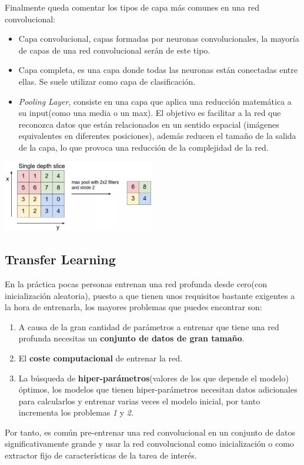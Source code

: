 \documentclass[12,twoside]{TFG-GM}
\theoremstyle{definition}
\theoremstyle{remark}
\begin{document}
Finalmente queda comentar los tipos de capa más comunes en una red convolucional: 
\begin{itemize}
\item Capa convolucional, capas formadas por neuronas convolucionales, la mayoría de capas de una red convolucional serán de este tipo.
\item Capa completa, es una capa donde todas las neuronas están conectadas entre ellas. Se suele utilizar como capa de clasificación. 
\item \textit{Pooling Layer}, consiste en una capa que aplica una reducción matemática a su input(como una media o un max). El objetivo es facilitar a la red que reconozca datos que están relacionados en un sentido espacial (imágenes equivalentes en diferentes posiciones), además reducen el tamaño de la salida de la capa, lo que provoca una reducción de la complejidad de la red.
\end{itemize}

\begin{center}
\includegraphics[width = 0.5\textwidth]{Images/pooling1.png} 
\end{center}

\newpage
\subsection{Transfer Learning}

En la práctica pocas personas entrenan una red profunda desde cero(con inicialización aleatoria), puesto a que tienen unos requisitos bastante exigentes a la hora de entrenarla, los mayores problemas que puedes encontrar son: 
\begin{enumerate}
\item A causa de la gran cantidad de parámetros a entrenar que tiene una red profunda necesitas un \textbf{conjunto de datos de gran tamaño}.
\item El \textbf{coste computacional} de entrenar la red. 
\item La búsqueda de \textbf{hiper-parámetros}(valores de los que depende el modelo) óptimos, los modelos que tienen hiper-parámetros necesitan datos adicionales para calcularlos y entrenar varias veces el modelo inicial, por tanto incrementa los problemas \textit{1} y \textit{2}.
\end{enumerate}
Por tanto, es común pre-entrenar una red convolucional en un conjunto de datos significativamente grande y usar la red convolucional como inicialización o como extractor fijo de características de la tarea de interés. 
\end{document}
